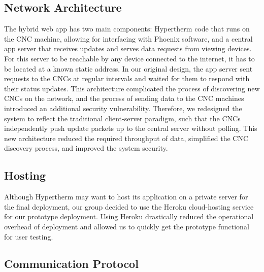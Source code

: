 \documentclass[12pt,letterpaper,titlepage]{article}
\begin{document}
\subsection{Network Architecture} \label{sec:NetworkArchitecture}

The hybrid web app has two main components: Hypertherm code that runs on the CNC machine, allowing for interfacing with Phoenix software, and a central app server that receives updates and serves data requests from viewing devices. For this server to be reachable by any device connected to the internet, it has to be located at a known static address. In our original design, the app server sent requests to the CNCs at regular intervals and waited for them to respond with their status updates. This architecture complicated the process of discovering new CNCs on the network, and the process of sending data to the CNC machines introduced an additional security vulnerability. Therefore, we redesigned the system to reflect the traditional client-server paradigm, such that the CNCs independently push update packets up to the central server without polling. This new architecture reduced the required throughput of data, simplified the CNC discovery process, and improved the system security.

\subsection{Hosting} \label{sec:Hosting}

Although Hypertherm may want to host its application on a private server for the final deployment, our group decided to use the Heroku cloud-hosting service for our prototype deployment. Using Heroku drastically reduced the operational overhead of deployment and allowed us to quickly get the prototype functional for user testing.

\subsection{Communication Protocol} \label{sec:CommunicationProtocol}
\end{document}
